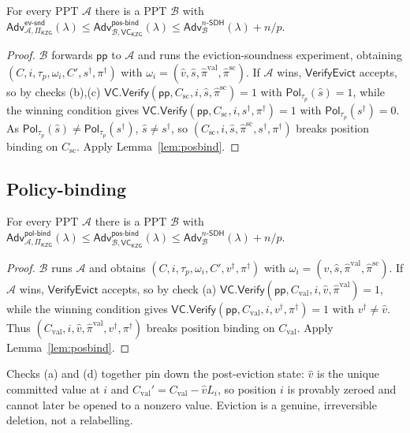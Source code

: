 \documentclass[version=submission]{iacrcc}
\theoremstyle{definition}
\newcommand{\secpar}{\lambda}
\newcommand{\PPT}{\mathrm{PPT}}
\newcommand{\Vfy}{\mathsf{Verify}}
\newcommand{\VfyEvict}{\mathsf{VerifyEvict}}
\newcommand{\pp}{\mathsf{pp}}
\newcommand{\Pol}{\mathsf{Pol}}
\newcommand{\Adv}{\mathsf{Adv}}
\newcommand{\Val}{\mathrm{val}}
\newcommand{\Sc}{\mathrm{sc}}
\newcommand{\Cval}{C_{\Val}}
\newcommand{\Csc}{C_{\Sc}}
\newcommand{\A}{\mathcal{A}}
\newcommand{\B}{\mathcal{B}}
\newcommand{\VC}{\mathsf{VC}}
\newcommand{\nsdh}{n\text{-}\mathsf{SDH}}
\newcommand{\posbind}{\mathsf{pos\text{-}bind}}
\newcommand{\evsnd}{\mathsf{ev\text{-}snd}}
\newcommand{\polbind}{\mathsf{pol\text{-}bind}}
\begin{document}
\begin{theorem}\label{thm:evsnd}
For every $\PPT$ $\A$ there is a $\PPT$ $\B$ with
$\Adv^{\evsnd}_{\A,\Pi_{\mathsf{KZG}}}(\secpar)\le
 \Adv^{\posbind}_{\B,\VC_{\mathsf{KZG}}}(\secpar)\le\Adv^{\nsdh}_{\B}(\secpar)+n/p$.
\end{theorem}
\begin{proof}
$\B$ forwards $\pp$ to $\A$ and runs the eviction-soundness experiment, obtaining
$(C,i,\tau_{\!p},\omega_i,C',s^{\dagger},\pi^{\dagger})$ with
$\omega_i=(\hat v,\hat s,\hat\pi^{\Val},\hat\pi^{\Sc})$. If $\A$ wins,
$\VfyEvict$ accepts, so by checks (b),(c)
$\VC.\Vfy(\pp,\Csc,i,\hat s,\hat\pi^{\Sc})=1$ with $\Pol_{\tau_{\!p}}(\hat s)=1$,
while the winning condition gives
$\VC.\Vfy(\pp,\Csc,i,s^{\dagger},\pi^{\dagger})=1$ with
$\Pol_{\tau_{\!p}}(s^{\dagger})=0$. As $\Pol_{\tau_{\!p}}(\hat s)\neq
\Pol_{\tau_{\!p}}(s^{\dagger})$, $\hat s\neq s^{\dagger}$, so
$(\Csc,i,\hat s,\hat\pi^{\Sc},s^{\dagger},\pi^{\dagger})$ breaks position binding
on $\Csc$. Apply Lemma~\ref{lem:posbind}.
\end{proof}

\subsection{Policy-binding}

\begin{theorem}\label{thm:polbind}
For every $\PPT$ $\A$ there is a $\PPT$ $\B$ with
$\Adv^{\polbind}_{\A,\Pi_{\mathsf{KZG}}}(\secpar)\le
 \Adv^{\posbind}_{\B,\VC_{\mathsf{KZG}}}(\secpar)\le\Adv^{\nsdh}_{\B}(\secpar)+n/p$.
\end{theorem}
\begin{proof}
$\B$ runs $\A$ and obtains
$(C,i,\tau_{\!p},\omega_i,C',v^{\dagger},\pi^{\dagger})$ with
$\omega_i=(\hat v,\hat s,\hat\pi^{\Val},\hat\pi^{\Sc})$. If $\A$ wins,
$\VfyEvict$ accepts, so by check (a)
$\VC.\Vfy(\pp,\Cval,i,\hat v,\hat\pi^{\Val})=1$, while the winning condition gives
$\VC.\Vfy(\pp,\Cval,i,v^{\dagger},\pi^{\dagger})=1$ with $v^{\dagger}\neq\hat v$.
Thus $(\Cval,i,\hat v,\hat\pi^{\Val},v^{\dagger},\pi^{\dagger})$ breaks position
binding on $\Cval$. Apply Lemma~\ref{lem:posbind}.
\end{proof}

\begin{remark}
Checks (a) and (d) together pin down the post-eviction state: $\hat v$ is the
unique committed value at $i$ and $\Cval'=\Cval-\hat v L_i$, so position $i$ is
provably zeroed and cannot later be opened to a nonzero value. Eviction is a
genuine, irreversible deletion, not a relabelling.
\end{remark}
\end{document}
